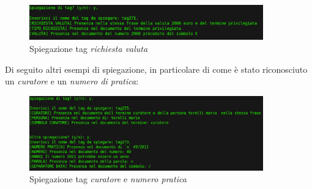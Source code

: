 \begin{figure}[H]
	\centering
	\includegraphics[width=0.9\textwidth]{img/interfaces/CLI-spiegazioneRich.png}
	\caption[Schermata CLI spiegazione]{Spiegazione tag \emph{richiesta valuta}}
	\label{CLI-spiegaRichiesta}
\end{figure}

Di seguito altri esempi di spiegazione, in particolare di come è stato riconosciuto un \emph{curatore} e un \emph{numero di pratica}:
\begin{figure}[H]
	\centering
	\includegraphics[width=0.9\textwidth]{img/interfaces/CLI-spiegazione.png}
	\caption[Schermata CLI altre spiegazioni]{Spiegazione tag \emph{curatore} e \emph{numero pratica}}
	\label{CLI-spiega}
\end{figure}
\clearpage